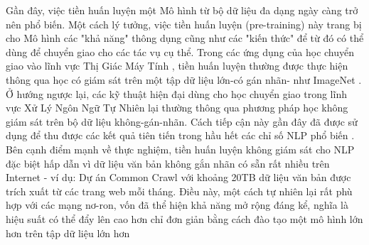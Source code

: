 Gần đây,  việc tiền huấn luyện một Mô hình từ bộ dữ liệu đa dạng ngày càng trở nên phổ biến.  Một cách lý tưởng,  việc tiền huấn luyện (pre-training) này trang bị cho Mô hình các "khả năng" thông dụng cũng như các "kiến thức" để từ đó có thể dùng để chuyển giao cho các tác vụ cụ thể. Trong các ứng dụng của học chuyển giao vào lĩnh vực Thị Giác Máy Tính \citep{oquab2014learning, thrun2004advances, minyoung2016ImageNet}, tiền huấn luyện thường được thực hiện thông qua học có giám sát trên một tập dữ liệu lớn-có gán nhãn- như ImageNet \citep{Deng2009ImageNet, Russakovsky2015ImageNet}.  Ở hướng ngược lại,  các  kỹ thuật hiện đại dùng cho học chuyển giao trong lĩnh vực Xử Lý Ngôn Ngữ Tự Nhiên lại thường thông qua  phương pháp học không giám sát trên bộ dữ liệu không-gán-nhãn.  Cách tiếp cận này gần đây đã được sử dụng để thu được các kết quả tiên tiến trong hầu hết các chỉ số NLP phổ biến   \citep{kentonbert,  dong2019unified,  liu2019roberta}.  Bên cạnh điểm mạnh về thực nghiệm,  tiền huấn luyện không giám sát cho NLP đặc biệt hấp dẫn vì dữ liệu văn bản không gắn nhãn có sẵn rất nhiều trên Internet - ví dụ: Dự án Common Crawl với khoảng 20TB dữ liệu văn bản được trích xuất từ các trang web mỗi tháng.  Điều này, một cách tự nhiên lại rất phù hợp với các mạng nơ-ron,  vốn đã thể hiện khả năng mở rộng đáng kể,  nghĩa là hiệu suất có thể đẩy lên cao  hơn chỉ đơn giản bằng cách đào tạo một mô hình lớn hơn trên tập dữ liệu lớn hơn \citep{hestnessdeep, shazeer2017outrageously, jozefowicz2016exploring, mahajan2018exploring, radford2019language}
